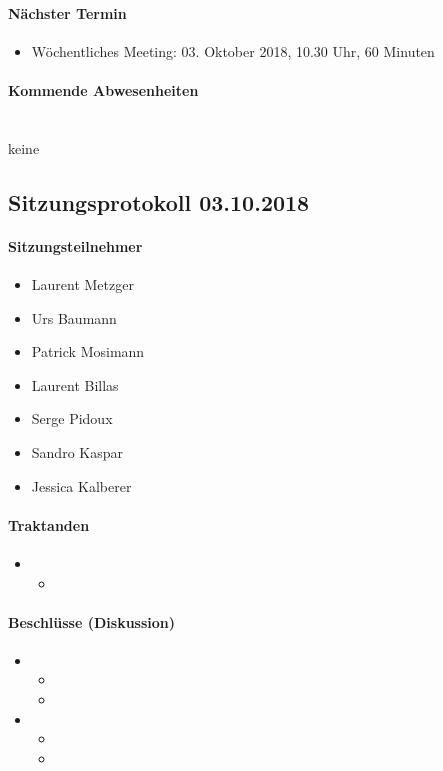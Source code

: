 \paragraph{Nächster Termin}
\begin{itemize}	
	\item Wöchentliches Meeting: 03. Oktober 2018, 10.30 Uhr, 60 Minuten
\end{itemize}

\paragraph{Kommende Abwesenheiten} \mbox{}\\
keine

\newpage





\subsection{Sitzungsprotokoll 03.10.2018}

\paragraph{Sitzungsteilnehmer}
\begin{itemize}	
	\item Laurent Metzger 
	\item Urs Baumann 
	\item Patrick Mosimann
	\item Laurent Billas
	\item Serge Pidoux
	\item Sandro Kaspar
	\item Jessica Kalberer
\end{itemize}

\paragraph{Traktanden}
\begin{itemize}	
	\item 
	\begin{itemize}
		\item 
	\end{itemize}
	
\end{itemize}

\paragraph{Beschlüsse (Diskussion)}
\begin{itemize}	
	\item 
	\begin{itemize}
		\item 
		\item 
	\end{itemize}
	\item 
	\begin{itemize}
		\item 
		\item 
	\end{itemize} 
\end{itemize}

